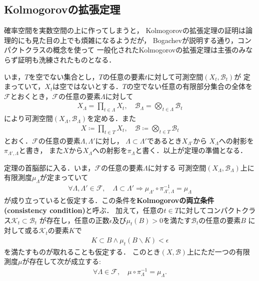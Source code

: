 \subsection{Kolmogorovの拡張定理}
	確率空間を実数空間の上に作ってしまうと，
	Kolmogorovの拡張定理の証明は論理的にも見た目の上でも煩雑になるようだが，
	Bogachevが説明する通り，コンパクトクラスの概念を使って
	一般化されたKolmogorovの拡張定理は主張のみならず証明も洗練されたものとなる．
	
	いま，$T$を空でない集合とし，$T$の任意の要素$t$に対して可測空間$(X_t,\mathscr{B}_t)$が
	定まっていて，$X_t$は空ではないとする．$T$の空でない任意の有限部分集合の全体を
	$\mathscr{F}$とおくとき，$\mathscr{F}$の任意の要素$\Lambda$に対して
	\begin{align}
		X_\Lambda = \prod_{t \in \Lambda} X_t,
		\quad \mathscr{B}_\Lambda = \bigotimes_{t \in \Lambda} \mathscr{B}_t
	\end{align}
	により可測空間$(X_\Lambda,\mathscr{B}_\Lambda)$を定める．また
	\begin{align}
		X \coloneqq \prod_{t \in T} X_t,
		\quad \mathscr{B} \coloneqq \bigotimes_{t \in T} \mathscr{B}_t
	\end{align}
	とおく．$\mathscr{F}$の任意の要素$\Lambda,\Lambda'$に対し，
	$\Lambda \subset \Lambda'$であるとき$X_{\Lambda'}$から
	$X_{\Lambda}$への射影を$\pi_{\Lambda',\Lambda}$と書き，
	また$X$から$X_\Lambda$への射影を$\pi_{\Lambda}$と書く．以上が定理の準備となる．
	
	定理の首脳部に入る．いま，$\mathscr{F}$の任意の要素$\Lambda$に対する
	可測空間$(X_\Lambda,\mathscr{B}_\Lambda)$上に有限測度$\mu_\Lambda$が定まっていて
	\begin{align}
		\forall \Lambda,\Lambda' \in \mathscr{F},\quad
		\Lambda \subset \Lambda' \Longrightarrow
		\mu_{\Lambda'} \circ \pi_{\Lambda',\Lambda}^{-1}
		= \mu_\Lambda
	\end{align}
	が成り立っていると仮定する．この条件を{\bf Kolmogorovの両立条件}
	{\bf (consistency condition)}と呼ぶ．
	加えて，任意の$t \in T$に対してコンパクトクラス$\mathcal{K}_t \subset \mathscr{B}_t$
	が存在し，任意の正数$\epsilon$及び$\mu_t(B) > 0$を満たす$\mathscr{B}_t$の任意の要素$B$
	に対して或る$\mathcal{K}_t$の要素$K$で
	\begin{align}
		K \subset B \wedge \mu_t(B \backslash K) < \epsilon
	\end{align}
	を満たすものが取れることも仮定する．
	このとき$(X,\mathscr{B})$上にただ一つの有限測度$\mu$が存在して次が成立する:
	\begin{align}
		\forall \Lambda \in \mathscr{F},\quad 
		\mu \circ \pi_{\Lambda}^{-1} = \mu_\Lambda.
	\end{align}
	
